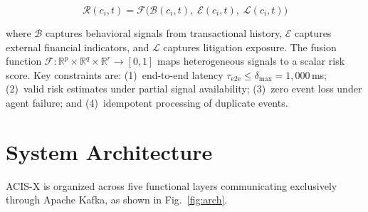 ﻿\documentclass[runningheads]{llncs}
\begin{document}
\begin{equation}
\mathcal{R}(c_i,t) = \mathcal{F}\bigl(\mathcal{B}(c_i,t),\;\mathcal{E}(c_i,t),\;\mathcal{L}(c_i,t)\bigr)
\label{eq:risk}
\end{equation}

where $\mathcal{B}$ captures behavioral signals from transactional history, $\mathcal{E}$ captures external financial indicators, and $\mathcal{L}$ captures litigation exposure. The fusion function $\mathcal{F}: \mathbb{R}^p\times\mathbb{R}^q\times\mathbb{R}^r \to [0,1]$ maps heterogeneous signals to a scalar risk score. Key constraints are: (1)~end-to-end latency $\tau_{\text{e2e}}\leq\delta_{\max}=1{,}000$\,ms; (2)~valid risk estimates under partial signal availability; (3)~zero event loss under agent failure; and (4)~idempotent processing of duplicate events.

\section{System Architecture}
\label{sec:architecture}

ACIS-X is organized across five functional layers communicating exclusively through Apache Kafka, as shown in Fig.~\ref{fig:arch}.
\end{document}
